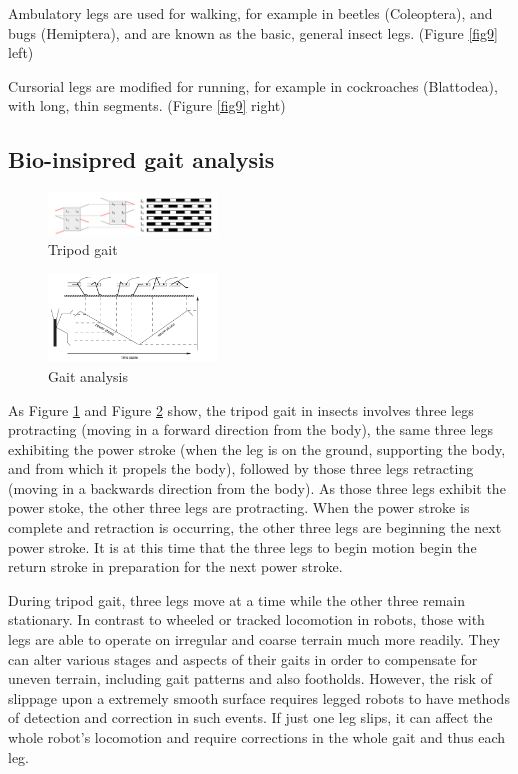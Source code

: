 \documentclass[conference]{IEEEtran}
\begin{document}
Ambulatory legs are used for walking, for example in beetles (Coleoptera), and bugs (Hemiptera), and are known as the basic, general insect legs. (Figure \ref{fig9} left)\cite{b3}

Cursorial legs are modified for running, for example in cockroaches (Blattodea), with long, thin segments. (Figure \ref{fig9} right)\cite{b3}

\subsection{Bio-insipred gait analysis}\label{ss}
\begin{figure}
    \centerline{\includegraphics[width=0.4\textwidth]{tri.png}}
    \caption{Tripod gait}
    \label{fig6}
\end{figure}

\begin{figure}
    \centerline{\includegraphics[width=0.4\textwidth]{gait.png}}
    \caption{Gait analysis}
    \label{fig7}
\end{figure}

As Figure \ref{fig6} and Figure \ref{fig7} show, the tripod gait in insects involves three legs protracting (moving in a forward direction from the body), the same three legs exhibiting the power stroke (when the leg is on the ground, supporting the body, and from which it propels the body), followed by those three legs retracting (moving in a backwards direction from the body). As those three legs exhibit the power stoke, the other three legs are protracting. When the power stroke is complete and retraction is occurring, the other three legs are beginning the next power stroke. It is at this time that the three legs to begin motion begin the return stroke in preparation for the next power stroke.\cite{b4}

During tripod gait, three legs move at a time while the other three remain stationary. In contrast to wheeled or tracked locomotion in robots, those with legs are able to operate on irregular and coarse terrain much more readily. They can alter various stages and aspects of their gaits in order to compensate for uneven terrain, including gait patterns and also footholds. However, the risk of slippage upon a extremely smooth surface requires legged robots to have methods of detection and correction in such events. If just one leg slips, it can affect the whole robot’s locomotion and require corrections in the whole gait and thus each leg.\cite{b5}
\end{document}
